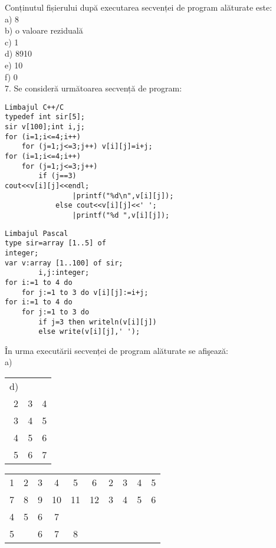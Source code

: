 Conținutul fișierului după executarea secvenței de program alăturate este:\\
a) 8\\
b) o valoare reziduală\\
c) 1\\
d) 8910\\
e) 10\\
f) 0\\
7. Se consideră următoarea secvență de program:

\begin{verbatim}
Limbajul C++/C
typedef int sir[5];
sir v[100];int i,j;
for (i=1;i<=4;i++)
    for (j=1;j<=3;j++) v[i][j]=i+j;
for (i=1;i<=4;i++)
    for (j=1;j<=3;j++)
        if (j==3)
cout<<v[i][j]<<endl;
                |printf("%d\n",v[i][j]);
            else cout<<v[i][j]<<' ';
                |printf("%d ",v[i][j]);
\end{verbatim}

\begin{verbatim}
Limbajul Pascal
type sir=array [1..5] of
integer;
var v:array [1..100] of sir;
        i,j:integer;
for i:=1 to 4 do
    for j:=1 to 3 do v[i][j]:=i+j;
for i:=1 to 4 do
    for j:=1 to 3 do
        if j=3 then writeln(v[i][j])
        else write(v[i][j],' ');
\end{verbatim}

În urma executării secvenței de program alăturate se afişează:\\
a)

\begin{center}
\begin{tabular}{rll}
d) &  &  \\
2 & 3 & 4 \\
3 & 4 & 5 \\
4 & 5 & 6 \\
5 & 6 & 7 \\
\end{tabular}
\end{center}

\begin{center}
\begin{tabular}{cccccccccc}
1 & 2 & 3 & 4 & 5 & 6 & 2 & 3 & 4 & 5 \\
7 & 8 & 9 & 10 & 11 & 12 & 3 & 4 & 5 & 6 \\
4 & 5 & 6 & 7 &  &  &  &  &  &  \\
5 &  & 6 & 7 & 8 &  &  &  &  &  \\
\end{tabular}
\end{center}

